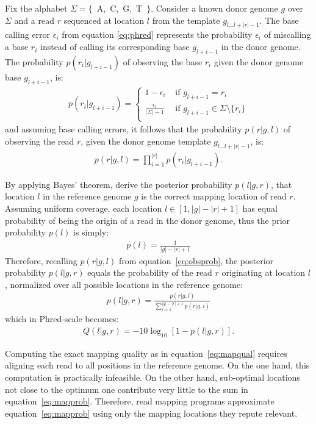 Fix the alphabet $\Sigma = \{$~A,~C,~G,~T~$\}$. Consider a known donor genome $g$ over $\Sigma$ and a read $r$ sequenced at location $l$ from the template $g_{l \dots l+|r|-1}$.
The base calling error $\epsilon_i$ from equation \ref{eq:phred} represents the probability $\epsilon_i$ of miscalling a base $r_i$ instead of calling its corresponding base $g_{l+i-1}$ in the donor genome.
The probability $p(r_i | g_{l+i-1})$ of observing the base $r_i$ given the donor genome base $g_{l+i-1}$, is:
\begin{eqnarray}
p(r_i | g_{l+i-1}) = \left\{
\begin{array}{ll}
1-\epsilon_i                  & \text{ if } g_{l+i-1} = r_i\\
\frac{\epsilon_i}{|\Sigma|-1} & \text{ if } g_{l+i-1} \in \Sigma \setminus \{r_i\}\\
\end{array}
\right.
\end{eqnarray}
and assuming \iid base calling errors, it follows that the probability $p(r | g, l)$ of observing the read $r$, given the donor genome template $g_{l \dots l+|r|-1}$, is:
\begin{eqnarray}
\label{eq:obsprob}
p(r | g, l) = \prod_{i=1}^{|r|}{p(r_i | g_{l+i-1})}.
\end{eqnarray}

By applying Bayes' theorem, \citeauthor{Li2008} derive the posterior probability $p(l|g,r)$, that location $l$ in the reference genome $g$ is the correct mapping location of read $r$.
Assuming uniform coverage, each location $l \in [1, |g| - |r| + 1]$ has equal probability of being the origin of a read in the donor genome, thus the prior probability $p(l)$ is simply:
\begin{eqnarray}
p(l) = \frac{1}{|g| - |r| + 1}
\end{eqnarray}
Therefore, recalling $p(r | g, l)$ from equation~\ref{eq:obsprob}, the posterior probability $p(l|g,r)$ equals the probability of the read $r$ originating at location $l$, normalized over all possible locations in the reference genome:
\begin{eqnarray}
\label{eq:mapprob}
p(l|g,r) = \frac{p(r|g,l)}{\sum_{i=1}^{|g| - |r| + 1}{p(r|g,i)}}
\end{eqnarray}
which in Phred-scale becomes:
\begin{eqnarray}
\label{eq:mapqual}
Q(l|g,r) = -10 \log_{10}[1 - p(l|g,r)].
\end{eqnarray}

Computing the exact mapping quality as in equation~\ref{eq:mapqual} requires aligning each read to all positions in the reference genome.
On the one hand, this computation is practically infeasible.
On the other hand, sub-optimal locations not close to the optimum one contribute very little to the sum in equation~\ref{eq:mapprob}.
Therefore, read mapping programs approximate equation~\ref{eq:mapprob} using only the mapping locations they repute relevant.

